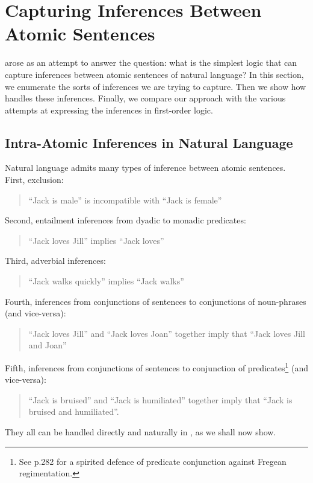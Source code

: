 
\section{Capturing Inferences Between Atomic Sentences}\label{naturalLanguageInference}

\NI \ELFULL{} arose as an attempt to answer the question: what is the
simplest logic that can capture inferences between atomic sentences of
natural language?  In this section, we enumerate the sorts of
inferences we are trying to capture.  Then we show how \ELABR{}
handles these inferences.  Finally, we compare our approach with the
various attempts at expressing the inferences in first-order logic.

\subsection{Intra-Atomic Inferences in Natural Language}

\NI Natural language admits many types of inference between atomic
sentences.  First, exclusion:
\begin{quote}
``Jack is male'' is incompatible with ``Jack is female''
\end{quote}
Second, entailment inferences from dyadic to monadic predicates:
\begin{quote}
``Jack loves Jill'' implies ``Jack loves''
\end{quote}
Third, adverbial inferences:
\begin{quote}
``Jack walks quickly'' implies ``Jack walks''
\end{quote}
Fourth, inferences from conjunctions of sentences to conjunctions of noun-phrases (and vice-versa):
\begin{quote}
``Jack loves Jill'' and ``Jack loves Joan'' together imply that ``Jack loves Jill and Joan''
\end{quote}
Fifth, inferences from conjunctions of sentences to conjunction of predicates\footnote{See \cite{sommers} p.282 for a spirited defence of predicate conjunction against Fregean regimentation.} (and vice-versa):
\begin{quote}
``Jack is bruised'' and ``Jack is humiliated'' together imply that ``Jack is bruised and humiliated''.
\end{quote}

\NI They all can be handled directly and naturally in \ELABR{}, as we
shall now show.


